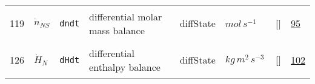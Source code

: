\begin{longtable}{|p{1cm}|p{3cm}|p{3cm}|p{7cm}|p{3.0cm}|p{3cm}|p{2cm}|p{1cm}|}
    119
             & \hypertarget{"v:119"}{ $ {\dot{n}}{_{{N S}}} $}
             & \verb|dndt|
             & differential molar mass balance
             & \begin{lay}diffState \end{lay}
             & $ mol \,s^{-1} \, $
             & []
             & \hyperlink{"e:95"}{ 95 }
                 \\
    126
             & \hypertarget{"v:126"}{ $ {\dot{H}}{_{N}} $}
             & \verb|dHdt|
             & differential enthalpy balance
             & \begin{lay}diffState \end{lay}
             & $ kg \,m^{2} \,s^{-3} \, $
             & []
             & \hyperlink{"e:102"}{ 102 }
                 \\
    \end{longtable}